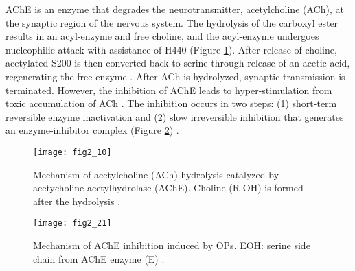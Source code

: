 \begin{refsection}
AChE is an enzyme that degrades the neurotransmitter, acetylcholine (ACh), at
the synaptic region of the nervous system. The hydrolysis
of the carboxyl ester results in an acyl-enzyme and free choline, and the
acyl-enzyme undergoes nucleophilic attack with assistance of H440 (Figure
\ref{fig:ache}). After release of choline, acetylated S200 is then converted
back to serine through release of an acetic acid, regenerating the free enzyme
\cite{Ross2013b}. After ACh is hydrolyzed, synaptic transmission is terminated.
However, the inhibition of AChE leads to hyper-stimulation from toxic
accumulation of ACh \cite{Soreq2001}. The inhibition occurs in two steps: (1)
short-term reversible enzyme inactivation and (2) slow irreversible inhibition
that generates an enzyme-inhibitor complex (Figure \ref{fig:op-ache})
\cite{Ross2013b}.

\begin{figure}[htbp] \centering \texttt{[image: fig2\_10]}
    \caption[Mechanism of acetylcholine (ACh) hydrolysis catalyzed by
        acetycholine acetylhydrolase (AChE). Choline (R-OH) is formed after the
    hydrolysis.] {Mechanism of acetylcholine (ACh) hydrolysis catalyzed by
        acetycholine acetylhydrolase (AChE). Choline (R-OH) is formed after the
        hydrolysis \cite{Ross2013b}.} \label{fig:ache}
\end{figure}
\begin{figure}[htbp] \centering \texttt{[image: fig2\_21]}
    \caption[Mechanism of AChE inhibition induced by OPs. EOH: serine side
    chain from AChE enzyme (E).]{Mechanism of AChE inhibition induced by OPs.
        EOH: serine side chain from AChE enzyme (E) \cite{Colovic2013b}.}
    \label{fig:op-ache}
\end{figure}


\end{refsection}
